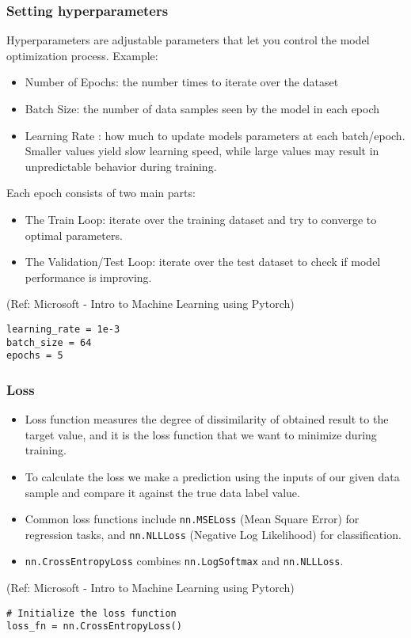 \begin{frame}[fragile] \frametitle{Setting hyperparameters}

Hyperparameters are adjustable parameters that let you control the model optimization process. Example:

\begin{itemize}
\item Number of Epochs: the number times to iterate over the dataset
\item Batch Size: the number of data samples seen by the model in each epoch
\item Learning Rate : how much to update models parameters at each batch/epoch. Smaller values yield slow learning speed, while large values may result in unpredictable behavior during training.
\end{itemize}




Each epoch consists of two main parts:

\begin{itemize}
\item The Train Loop: iterate over the training dataset and try to converge to optimal parameters.
\item The Validation/Test Loop: iterate over the test dataset to check if model performance is improving.
\end{itemize}

\tiny{(Ref: Microsoft - Intro to Machine Learning using Pytorch)}

\begin{lstlisting}
learning_rate = 1e-3
batch_size = 64
epochs = 5
\end{lstlisting}
\end{frame}


\begin{frame}[fragile] \frametitle{Loss}


\begin{itemize}
\item Loss function measures the degree of dissimilarity of obtained result to the target value, and it is the loss function that we want to minimize during training. \item To calculate the loss we make a prediction using the inputs of our given data sample and compare it against the true data label value.
\item Common loss functions include \lstinline|nn.MSELoss| (Mean Square Error) for regression tasks, and \lstinline|nn.NLLLoss| (Negative Log Likelihood) for classification. 
\item \lstinline|nn.CrossEntropyLoss| combines \lstinline|nn.LogSoftmax| and \lstinline|nn.NLLLoss|.
\end{itemize}

\tiny{(Ref: Microsoft - Intro to Machine Learning using Pytorch)}

\begin{lstlisting}
# Initialize the loss function
loss_fn = nn.CrossEntropyLoss()
\end{lstlisting}

\end{frame}

